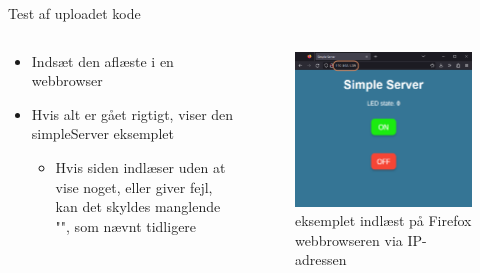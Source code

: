 \documentclass[aspectratio=169]{beamer}
\begin{document}
\begin{frame}{Test af uploadet kode}
\begin{columns}

	\begin{column}{0.5\textwidth}
		\begin{textBox}
			\begin{itemize}
				\item Indsæt den aflæste  i en webbrowser
				\item Hvis alt er gået rigtigt, viser den simpleServer eksemplet
				\begin{itemize}
					\item Hvis siden indlæser uden at vise noget, eller giver fejl, kan det skyldes manglende "", som nævnt tidligere
				\end{itemize}
			\end{itemize}
		\end{textBox}
	\end{column}

	\begin{column}{0.5\textwidth}
		\begin{figure}
  			\includegraphics[height=0.6\textheight,keepaspectratio=true]{assets/pictures/visit-page.png}
  			\caption{ eksemplet indlæst på Firefox webbrowseren via IP-adressen}
  			\label{fig:visit-page}
		\end{figure}
	\end{column}
	
\end{columns}
\end{frame}
\end{document}
